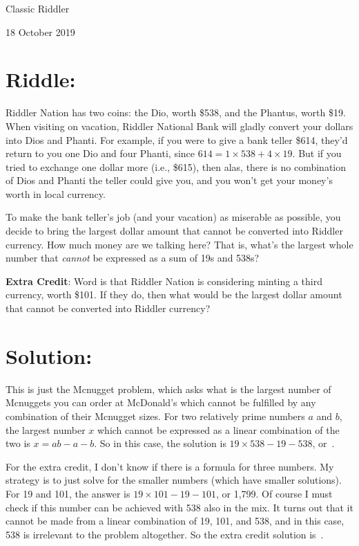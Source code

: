 \documentclass{article}
\begin{document}
\pagestyle{empty} %

\begin{center}
{\LARGE Classic Riddler}

\vspace{0.15in}

{\Large 18 October 2019}
\end{center}


\section*{Riddle:}

Riddler Nation has two coins: the Dio, worth \$538, and the Phantus, worth \$19.
When visiting on vacation, Riddler National Bank will gladly convert your dollars into Dios and Phanti.
For example, if you were to give a bank teller \$614, they’d return to you one Dio and four Phanti, since $614=1\times538+4\times19$.
But if you tried to exchange one dollar more (i.e., \$615), then alas, there is no combination of Dios and Phanti the teller could give you, and you won’t get your money's worth in local currency.

To make the bank teller's job (and your vacation) as miserable as possible, you decide to bring the largest dollar amount that cannot be converted into Riddler currency.
How much money are we talking here?
That is, what's the largest whole number that \textit{cannot} be expressed as a sum of 19s and 538s?

\textbf{Extra Credit}: Word is that Riddler Nation is considering minting a third currency, worth \$101.
If they do, then what would be the largest dollar amount that cannot be converted into Riddler currency?

\section*{Solution:}

This is just the Mcnugget problem, which asks what is the largest number of Mcnuggets you can order at McDonald's which cannot be fulfilled by any combination of their Mcnugget sizes.
For two relatively prime numbers $a$ and $b$, the largest number $x$ which cannot be expressed as a linear combination of the two is $x=ab-a-b$.
So in this case, the solution is $19\times538-19-538$, or
\,.

For the extra credit, I don't know if there is a formula for three numbers.
My strategy is to just solve for the smaller numbers (which have smaller solutions).
For 19 and 101, the answer is $19\times101-19-101$, or 1,799.
Of course I must check if this number can be achieved with 538 also in the mix.
It turns out that it cannot be made from a linear combination of 19, 101, and 538, and in this case, 538 is irrelevant to the problem altogether.
So the extra credit solution is
\,.
\end{document}
